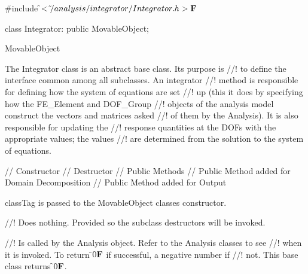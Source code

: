 
\indent \#include \f$<\tilde{ }/analysis/integrator/Integrator.h>{\bf F}$

\indent class Integrator: public MovableObject;

\indent MovableObject
\indent{}

\indent The Integrator class is an abstract base class. Its purpose is
//! to define the interface common among all subclasses. An integrator
//! method is responsible for defining how the system of equations are set
//! up (this it does by specifying how the FE\_Element and DOF\_Group
//! objects of the analysis model construct the vectors and matrices asked
//! of them by the Analysis). It is also responsible for updating the
//! response quantities at the DOFs with the appropriate values; the values
//! are determined from the solution to the system of equations.

\indent\indent // Constructor
\indent{}
\indent\indent // Destructor
\indent{}
\indent\indent // Public Methods
\indent{}
\indent{}
\indent{}
\indent{}
\indent{}
\indent\indent // Public Method added for Domain Decomposition
\indent{}
\indent\indent // Public Method added for Output
\indent{}

\p classTag is passed to the MovableObject classes constructor.

//! Does nothing. Provided so the subclass destructors will be invoked.

//! Is called by the Analysis object. Refer to the Analysis classes to see
//! when it is invoked. To return \f$0{\bf F}$ if successful, a negative number if
//! not. This base class returns \f$0{\bf F}$.

